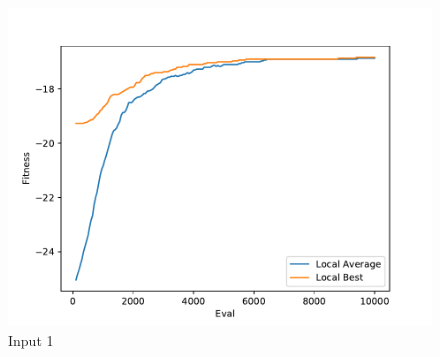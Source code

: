 \documentclass{standalone}
\begin{document}
\begin{figure}[!htb]
	\caption{Input 1}
	\label{fig:graph_1054}
	\includegraphics[width=\textwidth]{../graphs/graphs/1054.pdf}
\end{figure}
\end{document}

